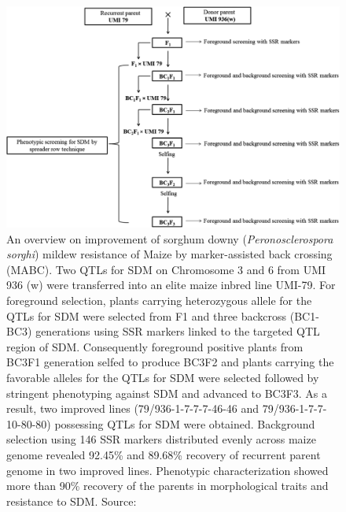 \documentclass[11pt,dvipsnames,ignorenonframetext,aspectratio=169]{beamer}
\begin{document}
\begin{frame}{}
\protect\hypertarget{section-12}{}
\begin{figure}
  \begin{columns}[T,onlytextwidth]

  \begin{center}
  \includegraphics[width=0.94\linewidth]{../images/sorghum_backcross_breeding_marker_assisted.png}
  \end{center}
  
  \caption{\newline An overview on improvement of sorghum downy (\textit{Peronosclerospora sorghi}) mildew resistance of Maize by marker-assisted back crossing (MABC). Two QTLs for SDM on Chromosome 3 and 6 from UMI 936 (w) were transferred into an elite maize inbred line UMI-79. For foreground selection, plants carrying heterozygous allele for the QTLs for SDM were selected from F1 and three backcross (BC1-BC3) generations using SSR markers linked to the targeted QTL region of SDM. Consequently foreground positive plants from BC3F1 generation selfed to produce BC3F2 and plants carrying the favorable alleles for the QTLs for SDM were selected followed by stringent phenotyping against SDM and advanced to BC3F3. As a result, two improved lines (79/936-1-7-7-7-46-46 and 79/936-1-7-7-10-80-80) possessing QTLs for SDM were obtained. Background selection using 146 SSR markers distributed evenly across maize genome revealed 92.45\% and 89.68\% recovery of recurrent parent genome in two improved lines. Phenotypic characterization showed more than 90\% recovery of the parents in morphological traits and resistance to SDM. Source: \cite{sumathi2020introgression}}
  \label{fig:sorghum-mas}
  
  \end{columns}
\end{figure}
\end{frame}
\end{document}
